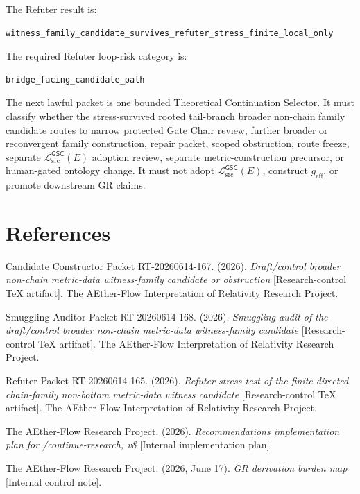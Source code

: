 \documentclass[11pt]{article}
\newcommand{\MetricData}{\mathcal{L}_{\mathrm{src}}^{\mathsf{GSC}}}
\newcommand{\geff}{g_{\mathrm{eff}}}
\begin{document}
The Refuter result is:

\begin{verbatim}
witness_family_candidate_survives_refuter_stress_finite_local_only
\end{verbatim}

The required Refuter loop-risk category is:

\begin{verbatim}
bridge_facing_candidate_path
\end{verbatim}

The next lawful packet is one bounded Theoretical Continuation Selector. It
must classify whether the stress-survived rooted tail-branch broader non-chain
family candidate routes to narrow protected Gate Chair review, further
broader or reconvergent family construction, repair packet, scoped
obstruction, route freeze, separate \(\MetricData(E)\) adoption review,
separate metric-construction precursor, or human-gated ontology change. It
must not adopt \(\MetricData(E)\), construct \(\geff\), or promote downstream
GR claims.

\section*{References}

Candidate Constructor Packet RT-20260614-167. (2026). \textit{Draft/control
broader non-chain metric-data witness-family candidate or obstruction}
[Research-control TeX artifact]. The AEther-Flow Interpretation of Relativity
Research Project.

Smuggling Auditor Packet RT-20260614-168. (2026). \textit{Smuggling audit of
the draft/control broader non-chain metric-data witness-family candidate}
[Research-control TeX artifact]. The AEther-Flow Interpretation of Relativity
Research Project.

Refuter Packet RT-20260614-165. (2026). \textit{Refuter stress test of the
finite directed chain-family non-bottom metric-data witness candidate}
[Research-control TeX artifact]. The AEther-Flow Interpretation of Relativity
Research Project.

The AEther-Flow Research Project. (2026). \textit{Recommendations
implementation plan for /continue-research, v8} [Internal implementation
plan].

The AEther-Flow Research Project. (2026, June 17). \textit{GR derivation
burden map} [Internal control note].
\end{document}
